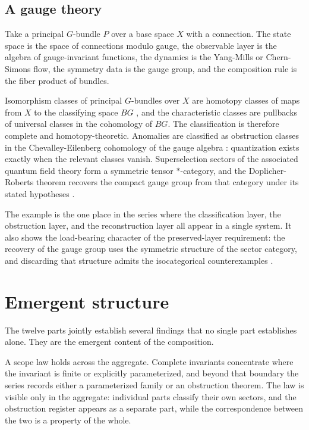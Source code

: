 \documentclass[11pt,letterpaper]{article}
\theoremstyle{definition}
\theoremstyle{remark}
\begin{document}
\subsection{A gauge theory}

Take a principal $G$-bundle $P$ over a base space $X$ with a connection. The state space is the space of connections modulo gauge, the observable layer is the algebra of gauge-invariant functions, the dynamics is the Yang-Mills or Chern-Simons flow, the symmetry data is the gauge group, and the composition rule is the fiber product of bundles.

Isomorphism classes of principal $G$-bundles over $X$ are homotopy classes of maps from $X$ to the classifying space $BG$ \cite{corpus-17,corpus-18}, and the characteristic classes are pullbacks of universal classes in the cohomology of $BG$. The classification is therefore complete and homotopy-theoretic. Anomalies are classified as obstruction classes in the Chevalley-Eilenberg cohomology of the gauge algebra \cite{corpus-19}: quantization exists exactly when the relevant classes vanish. Superselection sectors of the associated quantum field theory form a symmetric tensor $*$-category, and the Doplicher-Roberts theorem recovers the compact gauge group from that category under its stated hypotheses \cite{corpus-12,corpus-67}.

The example is the one place in the series where the classification layer, the obstruction layer, and the reconstruction layer all appear in a single system. It also shows the load-bearing character of the preserved-layer requirement: the recovery of the gauge group uses the symmetric structure of the sector category, and discarding that structure admits the isocategorical counterexamples \cite{corpus-74}.

\section{Emergent structure}

The twelve parts jointly establish several findings that no single part establishes alone. They are the emergent content of the composition.

A scope law holds across the aggregate. Complete invariants concentrate where the invariant is finite or explicitly parameterized, and beyond that boundary the series records either a parameterized family or an obstruction theorem. The law is visible only in the aggregate: individual parts classify their own sectors, and the obstruction register appears as a separate part, while the correspondence between the two is a property of the whole.
\end{document}
